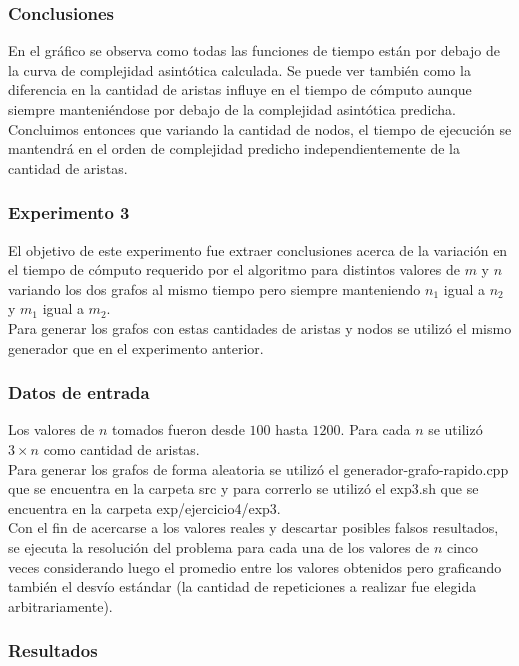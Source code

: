      	\subsubsection*{Conclusiones}\;
En el gráfico se observa como todas las funciones de tiempo están por debajo de la curva de complejidad asintótica calculada. Se puede ver también como la diferencia en la cantidad de aristas influye en el tiempo de cómputo aunque siempre manteniéndose por debajo de la complejidad asintótica predicha.\\
Concluimos entonces que variando la cantidad de nodos, el tiempo de ejecución se mantendrá en el orden de complejidad predicho independientemente de la cantidad de aristas.
    
    \subsubsection*{Experimento 3}\; 
    El objetivo de este experimento fue extraer conclusiones acerca de la variación en el tiempo de cómputo requerido por el algoritmo para distintos valores de $m$ y $n$ variando los dos grafos al mismo tiempo pero siempre manteniendo $n_1$ igual a $n_2$ y $m_1$ igual a $m_2$. \\
Para generar los grafos con estas cantidades de aristas y nodos se utilizó el mismo generador que en el experimento anterior. 
        
        \subsubsection*{Datos de entrada}\;
        \noindent Los valores de $n$ tomados fueron desde $100$ hasta $1200$. Para cada $n$ se utilizó $3 \times n$ como cantidad de aristas.\\
        Para generar los grafos de forma aleatoria se utilizó el generador-grafo-rapido.cpp que se encuentra en la carpeta src y para correrlo se utilizó el exp3.sh que se encuentra en la carpeta exp/ejercicio4/exp3. \\
        Con el fin de acercarse a los valores reales y descartar posibles falsos resultados, se ejecuta la resolución del problema para cada una de los valores de $n$ cinco veces considerando luego el promedio entre los valores obtenidos pero graficando también el desvío estándar (la cantidad de repeticiones a realizar fue elegida arbitrariamente).\; 
 		\subsubsection*{Resultados}\;

